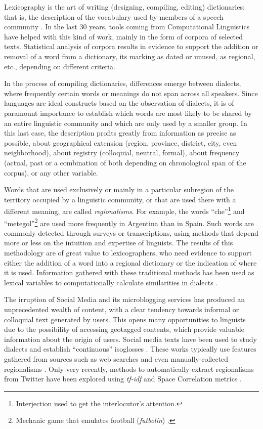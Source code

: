 Lexicography is the art of writing (designing, compiling, editing) dictionaries: that is, the description of the vocabulary used by members of a speech community \cite{atkins2008oxford}. In the last 30 years, tools coming from Computational Linguistics have helped with this kind of work, mainly in the form of corpora of selected texts. Statistical analysis of corpora results in evidence to support the addition or removal of a word from a dictionary, its marking as dated or unused, as regional, etc., depending on different criteria.

In the process of compiling dictionaries, differences emerge between dialects, where frequently certain words or meanings do not span across all speakers. Since languages are ideal constructs based on the observation of dialects, it is of paramount importance to establish which words are most likely to be shared by an entire linguistic community and which are only used by a smaller group. In this last case, the description profits greatly from information as precise as possible, about geographical extension (region, province, district, city, even neighborhood), about registry (colloquial, neutral, formal), about frequency (actual, past or a combination of both depending on chronological span of the corpus), or any other variable.

 Words that are used exclusively or mainly in a particular subregion of the territory occupied by a linguistic community, or that are used there with a different meaning, are called \emph{regionalisms}. For example, the words ``che''\footnote{Interjection used to get the interlocutor's attention.} and ``metegol''\footnote{Mechanic game that emulates football (\textit{futbolín}) \cite{academia2008diccionario}.} are used more frequently in Argentina than in Spain. Such words are commonly detected through surveys \cite{almeida1995variacion, labov2005atlas} or transcriptions, using methods that depend more or less on the intuition and expertise of linguists. The results of this methodology are of great value to lexicographers, who need evidence to support either the addition of a word into a regional dictionary or the indication of where it is used. Information gathered with these traditional methods has been used as lexical variables to computationally calculate similarities in dialects \cite{kessler1995computational, nerbonne1996phonetic}. 

The irruption of Social Media and its microblogging services has produced an unprecedented wealth of content, with a clear tendency towards informal or colloquial text generated by users. This opens many opportunities to linguists due to the possibility of accessing geotagged contents, which provide valuable information about the origin of users. Social media texts have been used to study dialects and establish ``continuous'' isoglosses \cite{gonccalves2014crowdsourcing, huang2016understanding}. These works typically use features gathered from sources such as web searches \cite{grieve2013site} and even manually-collected regionalisms \cite{ueda2003varilex}. 
Only very recently, methods to automatically extract regionalisms from Twitter have been explored using \emph{tf-idf} and Space Correlation metrics \cite{jimenez2018automatic}.

